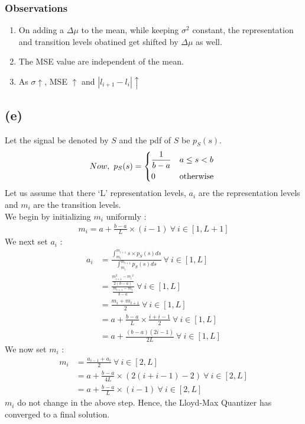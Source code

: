\documentclass[a4paper,fleqn,11pt]{article}
\theoremstyle{mytheor}
\begin{document}
\subsubsection*{Observations}
\begin{enumerate}
\item On adding a $\Delta\mu$ to the mean, while keeping $\sigma^2$ constant, the representation and transition levels obatined get shifted by $\Delta\mu$ as well.
\item The MSE value are independent of the mean.
\item As $\sigma \uparrow$, MSE $\uparrow$ and $|l_{i + 1} - l_i| \uparrow$
\end{enumerate}

\subsection*{(e)}
Let the signal be denoted by $S$ and the pdf of $S$ be $p_S (s)$.
\begin{align*}
Now,\ p_S (s) = \begin{dcases*}
					\frac{1}{b - a}	& $a \leq s < b$\\
					0  				& otherwise
				\end{dcases*}
\end{align*}
Let us assume that there `L' representation levels, $a_i$ are the representation levels and $m_i$ are the transition levels. \\
We begin by initializing $m_i$ uniformly :
\begin{align*}
m_i = a + \frac{b - a}{L} \times (i - 1)\ \forall\ i \in [1, L + 1]
\end{align*}
We next set $a_i$ :
\begin{align*}
a_i &  = \frac{\int_{m_i}^{m_{i + 1}} s \times p_S (s) ds}{\int_{m_i}^{m_{i + 1}} p_S (s) ds}\ \forall\ i \in [1, L] \\
    & = \frac{\frac{m_{i + 1}^2 - {m_i}^2}{2(b - a)}}{\frac{m_{i + 1} - {m_i}}{b - a}}\ \forall\ i \in [1, L] \\
    & = \frac{m_i + m_{i + 1}}{2}\ \forall\ i \in [1, L] \\
    & = a + \frac{b - a}{L} \times \frac{i + i - 1}{2}\ \forall\ i \in [1, L] \\
    & = a + \frac{(b - a)(2i - 1)}{2L}\ \forall\ i \in [1, L]
\end{align*}
We now set $m_i$ :
\begin{align*}
m_i & = \frac{a_{i - 1} + a_i}{2}\ \forall\ i \in [2, L] \\
	& = a + \frac{b - a}{4L} \times (2 (i + i - 1) - 2)\ \forall\ i \in [2, L] \\
	& = a + \frac{b - a}{L} \times (i - 1)\ \forall\ i \in [2, L]
\end{align*}
$m_i$ do not change in the above step. Hence, the Lloyd-Max Quantizer has converged to a final solution.
\end{document}
